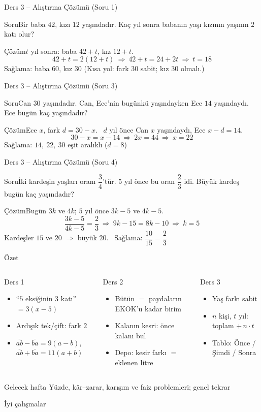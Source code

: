 \documentclass[aspectratio=169,11pt]{beamer}
\newcommand{\soru}[3]{%
\begin{frame}{#1}
  \begin{block}{Soru}\large #2\end{block}
  \pause
  \begin{exampleblock}{Çözüm}\large #3\end{exampleblock}
\end{frame}}
\newcommand{\ab}[1]{\overline{#1}}
\begin{document}
\soru{Ders 3 -- Alıştırma Çözümü (Soru 1)}
{Bir baba \(42\), kızı \(12\) yaşındadır. Kaç yıl sonra babanın yaşı kızının yaşının \(2\) katı olur?}
{\(t\) yıl sonra: baba \(42+t\), kız \(12+t\).
\[42+t=2(12+t)\ \Rightarrow\ 42+t=24+2t\ \Rightarrow\ t=18\]
Sağlama: baba \(60\), kız \(30\) \checkmark \quad (Kısa yol: fark \(30\) sabit; kız \(30\) olmalı.)}

\soru{Ders 3 -- Alıştırma Çözümü (Soru 3)}
{Can \(30\) yaşındadır. Can, Ece'nin bugünkü yaşındayken Ece \(14\) yaşındaydı. Ece bugün kaç yaşındadır?}
{Ece \(x\), fark \(d=30-x\). \ \(d\) yıl önce Can \(x\) yaşındaydı, Ece \(x-d=14\).
\[30-x=x-14\ \Rightarrow\ 2x=44\ \Rightarrow\ x=22\]
Sağlama: \(14,\ 22,\ 30\) eşit aralıklı (\(d=8\)) \checkmark}

\soru{Ders 3 -- Alıştırma Çözümü (Soru 4)}
{İki kardeşin yaşları oranı \(\dfrac{3}{4}\)'tür. \(5\) yıl önce bu oran \(\dfrac{2}{3}\) idi. Büyük kardeş bugün kaç yaşındadır?}
{Bugün \(3k\) ve \(4k\); \(5\) yıl önce \(3k-5\) ve \(4k-5\).
\[\frac{3k-5}{4k-5}=\frac{2}{3}\ \Rightarrow\ 9k-15=8k-10\ \Rightarrow\ k=5\]
Kardeşler \(15\) ve \(20\) \(\Rightarrow\) büyük \(20\). \ Sağlama: \(\dfrac{10}{15}=\dfrac{2}{3}\) \checkmark}


\begin{frame}{Özet}
\begin{columns}[t]
\begin{block}{Ders 1}
\begin{itemize}
\item ``\(5\) eksiğinin \(3\) katı'' \(=3(x-5)\)
\item Ardışık tek/çift: fark \(2\)
\item \(\ab{ab}-\ab{ba}=9(a-b)\), \ \(\ab{ab}+\ab{ba}=11(a+b)\)
\end{itemize}
\end{block}
\begin{block}{Ders 2}
\begin{itemize}
\item Bütün \(=\) paydaların EKOK'u kadar birim
\item Kalanın kesri: önce kalanı bul
\item Depo: kesir farkı \(=\) eklenen litre
\end{itemize}
\end{block}
\begin{block}{Ders 3}
\begin{itemize}
\item Yaş farkı sabit
\item \(n\) kişi, \(t\) yıl: toplam \(+\,n\cdot t\)
\item Tablo: Önce / Şimdi / Sonra
\end{itemize}
\end{block}
\end{columns}
\vspace{6pt}
\begin{alertblock}{Gelecek hafta}
Yüzde, kâr--zarar, karışım ve faiz problemleri; genel tekrar
\end{alertblock}
\end{frame}

\begin{frame}
\centering\Large İyi çalışmalar
\end{frame}
\end{document}
